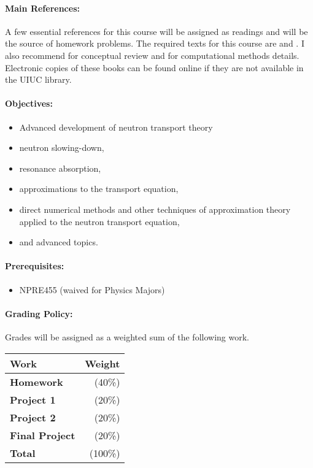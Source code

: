 \documentclass[11pt, a4paper]{article}
\begin{document}
\paragraph{Main References:}
A few essential references for this course will be assigned as readings and 
will be the source of homework problems. The required texts for this course are 
\cite{stacey_nuclear_2007} and \cite{bell_nuclear_1970}. I also recommend 
\cite{duderstadt_transport_1979} for conceptual review and 
\cite{lewis_computational_1993} for computational methods details.
Electronic copies of these books can be found online if they are not available
in the UIUC library.


\renewcommand{\refname}{\normalfont\selectfont\normalsize}\vspace{-1cm}


\paragraph{Objectives:}
\begin{itemize}
\item Advanced development of neutron transport theory
\item  neutron slowing-down,
\item resonance absorption,
\item  approximations to the transport equation,
\item  direct numerical methods and other techniques of approximation theory 
        applied to the neutron transport equation,
\item  and advanced topics. 
\end{itemize}

\paragraph{Prerequisites:}
\begin{itemize}
\item NPRE455 (waived for Physics Majors) 
\end{itemize}

\paragraph{Grading Policy:} Grades will be assigned as a weighted sum of the
following work.

\begin{table}[h]
\begin{tabularx}{\textwidth}{Xr}
        \textbf{Work} & \textbf{Weight} \\
\hline
\textbf{Homework}    & (40\%)  \\
\textbf{Project 1}    & (20\%)  \\
\textbf{Project 2}    & (20\%)  \\
\textbf{Final Project}  & (20\%)  \\
\hline
\textbf{Total}       & (100\%)\\
\end{tabularx}
\end{table}
\end{document}
